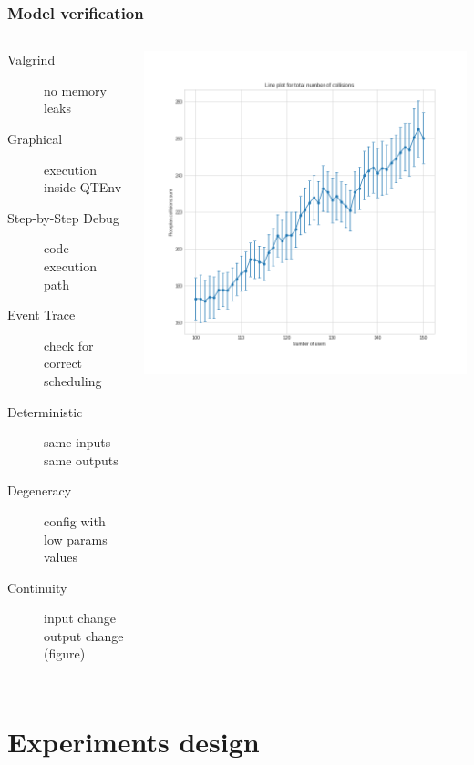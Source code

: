 \documentclass[aspectratio=169]{beamer}
\begin{document}
\begin{frame}
	\frametitle{Model verification}
	\begin{columns}
		\begin{description}
			\item[Valgrind] no memory leaks
			\item[Graphical] execution inside QTEnv
			\item[Step-by-Step Debug] code execution path
			\item[Event Trace] check for correct scheduling
			\item[Deterministic] same inputs \textrightarrow{} same outputs
			\item[Degeneracy] config with low params values
			\item[Continuity] input change \textrightarrow{} output
				change (figure)
		\end{description}
		\includegraphics[width=\textwidth]{img/continuity-collisions}
	\end{columns}
\end{frame}

\section{Experiments design}
\end{document}
